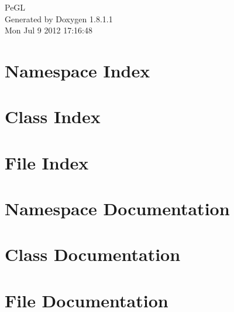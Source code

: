 \documentclass{book}
\begin{document}
\hypersetup{pageanchor=false,citecolor=blue}
\begin{titlepage}
\vspace*{7cm}
\begin{center}
{\Large Pe\-G\-L }\\
\vspace*{1cm}
{\large Generated by Doxygen 1.8.1.1}\\
\vspace*{0.5cm}
{\small Mon Jul 9 2012 17:16:48}\\
\end{center}
\end{titlepage}
\clearemptydoublepage
{}
\tableofcontents
\clearemptydoublepage
{}
\hypersetup{pageanchor=true,citecolor=blue}
\chapter{Namespace Index}

\chapter{Class Index}

\chapter{File Index}

\chapter{Namespace Documentation}

\chapter{Class Documentation}










\chapter{File Documentation}





\printindex
\end{document}

